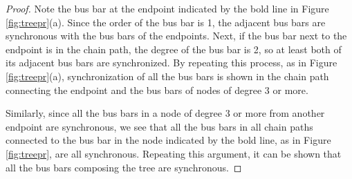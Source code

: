 \documentclass[graybox, envcountchap]{svmult}
\begin{document}
\begin{proof}
Note the bus bar at the endpoint indicated by the bold line in Figure \ref{fig:treepr}(a).
Since the order of the bus bar is 1, the adjacent bus bars are synchronous with the bus bars of the endpoints.
Next, if the bus bar next to the endpoint is in the chain path, the degree of the bus bar is 2, so at least both of its adjacent bus bars are synchronized.
By repeating this process, as in Figure \ref{fig:treepr}(a), synchronization of all the bus bars is shown in the chain path connecting the endpoint and the bus bars of nodes of degree 3 or more.

Similarly, since all the bus bars in a node of degree 3 or more from another endpoint are synchronous, we see that all the bus bars in all chain paths connected to the bus bar in the node indicated by the bold line, as in Figure \ref{fig:treepr}, are all synchronous.
Repeating this argument, it can be shown that all the bus bars composing the tree are synchronous.
\end{proof}
\end{document}
